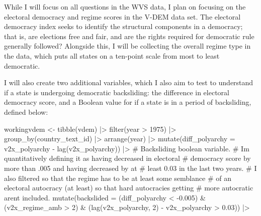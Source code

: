 \documentclass[
  letterpaper,
  DIV=11,
  numbers=noendperiod]{scrartcl}
\newenvironment{Shaded}{\begin{snugshade}}{\end{snugshade}}
\newcommand{\AttributeTok}[1]{\textcolor[rgb]{0.40,0.45,0.13}{#1}}
\newcommand{\CommentTok}[1]{\textcolor[rgb]{0.37,0.37,0.37}{#1}}
\newcommand{\DecValTok}[1]{\textcolor[rgb]{0.68,0.00,0.00}{#1}}
\newcommand{\FloatTok}[1]{\textcolor[rgb]{0.68,0.00,0.00}{#1}}
\newcommand{\FunctionTok}[1]{\textcolor[rgb]{0.28,0.35,0.67}{#1}}
\newcommand{\NormalTok}[1]{\textcolor[rgb]{0.00,0.23,0.31}{#1}}
\newcommand{\OtherTok}[1]{\textcolor[rgb]{0.00,0.23,0.31}{#1}}
\newcommand{\SpecialCharTok}[1]{\textcolor[rgb]{0.37,0.37,0.37}{#1}}
\begin{document}
While I will focus on all questions in the WVS data, I plan on focusing
on the electoral democracy and regime scores in the V-DEM data set. The
electoral democracy index seeks to identify the structural components in
a democracy; that is, are elections free and fair, and are the rights
required for democratic rule generally followed? Alongside this, I will
be collecting the overall regime type in the data, which puts all states
on a ten-point scale from most to least democratic.

I will also create two additional variables, which I also aim to test to
understand if a state is undergoing democratic backsliding: the
difference in electoral democracy score, and a Boolean value for if a
state is in a period of backsliding, defined below:

\begin{Shaded}
\begin{Highlighting}[]
\NormalTok{workingvdem }\OtherTok{\textless{}{-}} \FunctionTok{tibble}\NormalTok{(vdem) }\SpecialCharTok{|\textgreater{}}
  \FunctionTok{filter}\NormalTok{(year }\SpecialCharTok{\textgreater{}} \DecValTok{1975}\NormalTok{) }\SpecialCharTok{|\textgreater{}}
  \FunctionTok{group\_by}\NormalTok{(country\_text\_id) }\SpecialCharTok{|\textgreater{}}
  \FunctionTok{arrange}\NormalTok{(year) }\SpecialCharTok{|\textgreater{}}
  \FunctionTok{mutate}\NormalTok{(}\AttributeTok{diff\_polyarchy =}\NormalTok{ v2x\_polyarchy }\SpecialCharTok{{-}} \FunctionTok{lag}\NormalTok{(v2x\_polyarchy)) }\SpecialCharTok{|\textgreater{}}
  \CommentTok{\# Backsliding boolean variable.}
  \CommentTok{\# I\textquotesingle{}m quantitatively defining it as having decreased in electoral}
  \CommentTok{\# democracy score by more than .005 and having decreased by at}
  \CommentTok{\# least 0.03 in the last two years.}
  \CommentTok{\# I also filtered so that the regime has to be at least some semblance}
  \CommentTok{\# of an electoral autocracy (at least) so that hard autocracies getting}
  \CommentTok{\# more autocratic aren\textquotesingle{}t included.}
  \FunctionTok{mutate}\NormalTok{(}\AttributeTok{backslided =}\NormalTok{ (diff\_polyarchy }\SpecialCharTok{\textless{}} \SpecialCharTok{{-}}\FloatTok{0.005}\NormalTok{) }\SpecialCharTok{\&}
\NormalTok{           (v2x\_regime\_amb }\SpecialCharTok{\textgreater{}} \DecValTok{2}\NormalTok{) }\SpecialCharTok{\&}
\NormalTok{           (}\FunctionTok{lag}\NormalTok{(v2x\_polyarchy, }\DecValTok{2}\NormalTok{) }\SpecialCharTok{{-}}\NormalTok{ v2x\_polyarchy }\SpecialCharTok{\textgreater{}} \FloatTok{0.03}\NormalTok{)) }\SpecialCharTok{|\textgreater{}}

\end{Highlighting}
\end{Shaded}
\end{document}
